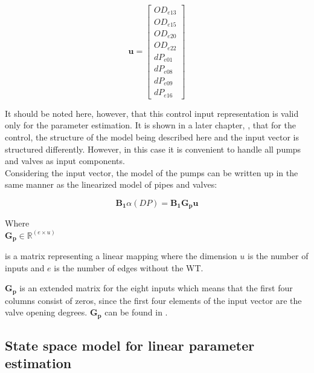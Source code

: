\begin{equation}
\pmb{u} =
\begin{bmatrix} 
OD_{e13} \\
OD_{e15} \\
OD_{e20} \\
OD_{e22} \\
dP_{e01} \\
dP_{e08} \\
dP_{e09} \\
dP_{e16} 
\label{inputvector}
\end{bmatrix} 
\end{equation}

It should be noted here, however, that this control input representation is valid only for the parameter estimation. It is shown in a later chapter, , that for the control, the structure of the model being described here and the input vector is structured differently. However, in this case it is convenient to handle all pumps and valves as input components. 
\\
Considering the input vector, the model of the pumps can be written up in the same manner as the linearized model of pipes and valves: 

\begin{equation}
\pmb{B_1} \alpha(DP) = \pmb{B_1} \pmb{G_p} \pmb{u}
\label{gamma_lin}
\end{equation}

\begin{minipage}[t]{0.20\textwidth}
Where\\
\hspace*{8mm} $\pmb{G_p} \in \pmb{\mathbb{R}}^{(e \times u)} $ 
\end{minipage}
\begin{minipage}[t]{0.68\textwidth}
\vspace*{2mm}
is a matrix representing a linear mapping where the dimension $u$ is the number of inputs and $e$ is the number of edges without the WT. 
\end{minipage} 

$\pmb{G_p}$ is an extended matrix for the eight inputs which means that the first four columns consist of zeros, since the first four elements of the input vector are the valve opening degrees. $\pmb{G_p}$ can be found in .


\subsection{State space model for linear parameter estimation}
 \label{SystemLin}

